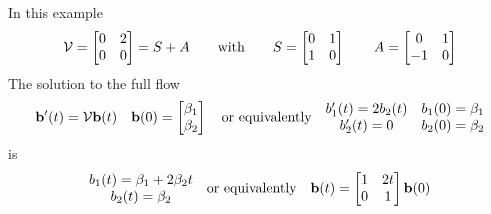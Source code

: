 \begin{eg}[$\ \vv(x,y)= 2y\hi.$]\label{eg:flowGen}
In this example
\begin{equation*}
\mathcal{V}=\left[\begin{matrix}0&2\cr 0&0\end{matrix}\right]=S+A\qquad{\rm with}\qquad
S=\left[\begin{matrix}0&1\cr 1&0\end{matrix}\right]\qquad
A=\left[\begin{matrix}0&1\cr -1&0\end{matrix}\right]
\end{equation*}
The solution to the full flow
\begin{equation*}
\mathbf{b}'(t)=\mathcal{V}\mathbf{b}(t)\quad 
\mathbf{b}(0)= \left[\begin{matrix}\beta_1 \\ \beta_2\end{matrix}\right]
\quad\text{or equivalently}\quad
\begin{matrix}b_1'(t)=2b_2(t) & b_1(0)=\beta_1\cr
        b_2'(t)=0 & b_2(0)=\beta_2\end{matrix}
\end{equation*}
is
\begin{equation*}
\begin{matrix}b_1(t)=\beta_1+2\beta_2 t\cr
        b_2(t)=\beta_2\end{matrix}
\quad\text{or equivalently}\quad
\mathbf{b}(t)=\left[\begin{matrix}1& 2t\cr 0&1\end{matrix}\right]\mathbf{b}(0)
\end{equation*}



\end{eg}
